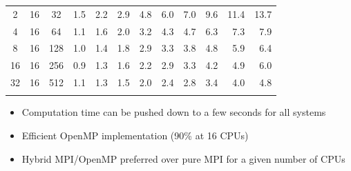 \begin{frame}
\begin{table}
\begin{tabular}{cccrrrrrrrrr}
	  2& 16& 32	&  1.5 	&  2.2 	&  2.9 	&  4.8  &  6.0  &  7.0  &  9.6  & 11.4  & 13.7  \\
	  4& 16& 64	&  1.1 	&  1.6 	&  2.0 	&  3.2  &  4.3  &  4.7  &  6.3  &  7.3  &  7.9  \\
	  8& 16&128	&  1.0 	&  1.4 	&  1.8 	&  2.9  &  3.3  &  3.8  &  4.8  &  5.9  &  6.4  \\
	 16& 16&256	&  0.9 	&  1.3 	&  1.6 	&  2.2  &  2.9  &  3.3  &  4.2  &  4.9  &  6.0  \\
	 32& 16&512	&  1.1 	&  1.3 	&  1.5 	&  2.0  &  2.4  &  2.8  &  3.4  &  4.0  &  4.8  \\
	   &   &   	&      	&      	&      	&    	&    	&	&	&	&	\\
	\hline                                                                           
	\hline
    \end{tabular}
    \end{table}

    \vspace{3mm}

    \begin{itemize}
	\item Computation time can be pushed down to a few seconds for all systems
	\item Efficient OpenMP implementation (90\% at 16 CPUs)
	\item Hybrid MPI/OpenMP preferred over pure MPI for a given number of CPUs
    \end{itemize}
\end{frame}


